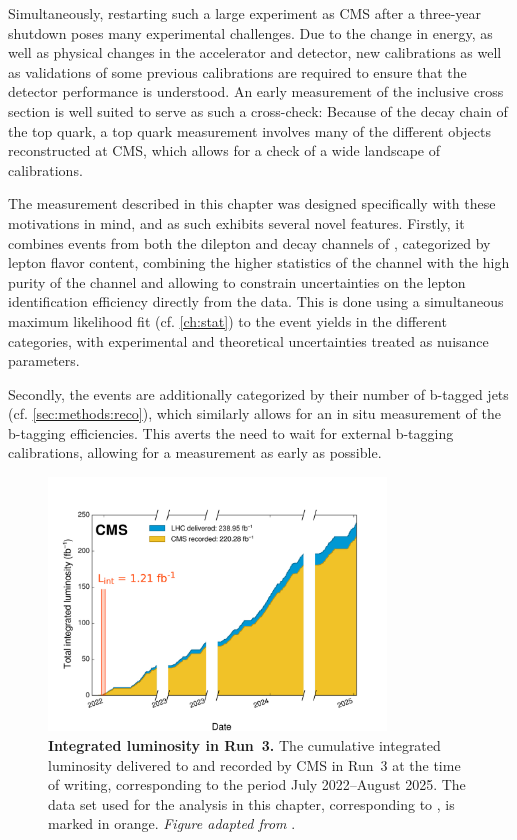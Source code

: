 Simultaneously, restarting such a large experiment as CMS after a three-year shutdown poses many experimental challenges. Due to the change in energy, as well as physical changes in the accelerator and detector, new calibrations as well as validations of some previous calibrations are required to ensure that the detector performance is understood. An early measurement of the inclusive \ttbar cross section is well suited to serve as such a cross-check: Because of the decay chain of the top quark, a top quark measurement involves many of the different objects reconstructed at CMS, which
allows for a check of a wide landscape of calibrations.

The measurement described in this chapter was designed specifically with these motivations in mind, and as such exhibits several novel features. Firstly, it combines events from both the dilepton and \ljets decay channels of \ttbar, categorized by lepton flavor content, combining the higher statistics of the \ljets channel with the high purity of the \emu channel and allowing to constrain uncertainties on the lepton identification efficiency directly from the data. This is done using a simultaneous maximum likelihood fit (cf. \cref{ch:stat}) to the event yields in the different categories, with experimental and theoretical uncertainties treated as nuisance parameters.

Secondly, the events are additionally categorized by their number of b-tagged jets (cf. \cref{sec:methods:reco}), which similarly allows for an in situ measurement of the b-tagging efficiencies. This averts the need to wait for external b-tagging calibrations, allowing for a measurement as early as possible.

\begin{figure}[!t]
    \centering
    \includegraphics[width=0.8\textwidth]{figures/ttxs/lumiplot_thesis.pdf}
    \caption{\textbf{Integrated luminosity in Run~3.} The cumulative integrated luminosity delivered to and recorded by CMS in Run~3 at the time of writing, corresponding to the period July 2022--August 2025. The data set used for the analysis in this chapter, corresponding to \lumiRIII, is marked in orange. \textit{Figure adapted from }.}
    \label{fig:ttxs:lumi}
\end{figure}

